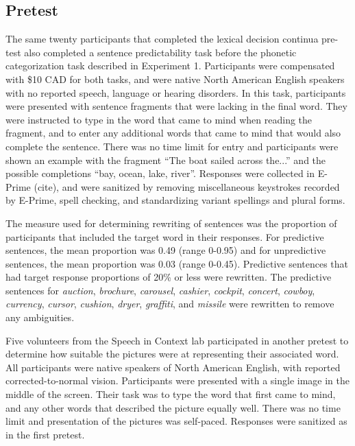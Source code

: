 \subsection{Pretest}

The same twenty participants that completed the lexical decision continua pre-test also completed a sentence predictability task before the phonetic categorization task described in Experiment 1. Participants were compensated with \$10 CAD for both tasks, and were native North American English speakers with no reported speech, language or hearing disorders. In this task, participants were presented with sentence fragments that were lacking in the final word.  They were instructed to type in the word that came to mind when reading the fragment, and to enter any additional words that came to mind that would also complete the sentence.  There was no time limit for entry and participants were shown an example with the fragment ``The boat sailed across the...'' and the possible completions ``bay, ocean, lake, river''.  Responses were collected in E-Prime (cite), and were sanitized by removing miscellaneous keystrokes recorded by E-Prime, spell checking, and standardizing variant spellings and plural forms.

The measure used for determining rewriting of sentences was the proportion of participants that included the target word in their responses.  For predictive sentences, the mean proportion was 0.49 (range 0-0.95) and for unpredictive sentences, the mean proportion was 0.03 (range 0-0.45).  Predictive sentences that had target response proportions of 20\% or less were rewritten.  The predictive sentences for \emph{auction}, \emph{brochure}, \emph{carousel}, \emph{cashier}, \emph{cockpit}, \emph{concert}, \emph{cowboy}, \emph{currency}, \emph{cursor}, \emph{cushion}, \emph{dryer}, \emph{graffiti}, and \emph{missile} were rewritten to remove any ambiguities.  

Five volunteers from the Speech in Context lab participated in another pretest to determine how suitable the pictures were at representing their associated word.  All participants were native speakers of North American English, with reported corrected-to-normal vision. Participants were presented with a single image in the middle of the screen.  Their task was to type the word that first came to mind, and any other words that described the picture equally well.  There was no time limit and presentation of the pictures was self-paced. Responses were sanitized as in the first pretest.  

